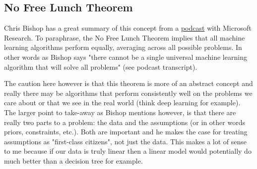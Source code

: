\subsection{No Free Lunch Theorem}

Chris Bishop has a great summary of this concept from a \href{https://www.microsoft.com/en-us/research/blog/machine-learning-and-the-learning-machine-with-dr-christopher-bishop/}{podcast} with Microsoft Research. To paraphrase, the No Free Lunch Theorem implies that all machine learning algorithms perform equally, averaging across all possible problems. In other words as Bishop says "there cannot be a single universal machine learning algorithm that will solve all problems" (see podcast transcript). 

The caution here however is that this theorem is more of an abstract concept and really there may be algorithms that perform consistently well on the problems we care about or that we see in the real world (think deep learning for example). The larger point to take-away as Bishop mentions however, is that there are really two parts to a problem: the data and the assumptions (or in other words priors, constraints, etc.). Both are important  and he makes the case for treating assumptions as "first-class citizens", not just the data. This makes a lot of sense to me because if our data is truly linear then a linear model would potentially do much better than a decision tree for example.

